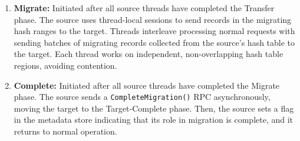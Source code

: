 \begin{enumerate}
\item {\bf Migrate:}
Initiated after all source threads have completed the Transfer phase.
%
The source uses thread-local sessions to send records in the migrating hash ranges
to the target.
%
Threads interleave processing normal requests with sending batches of migrating
records collected from the source's hash table to the target.
%
Each thread works on independent, non-overlapping hash table regions, avoiding
contention.

\item {\bf Complete:}
Initiated after all source threads have completed the Migrate phase.
%
The source sends a \texttt{CompleteMigration()} RPC asynchronously, moving the target to the Target-Complete phase.
%
Then,
%
the source sets a flag in the metadata store
indicating that its role in migration is complete, and it returns to
normal operation.

\end{enumerate}

